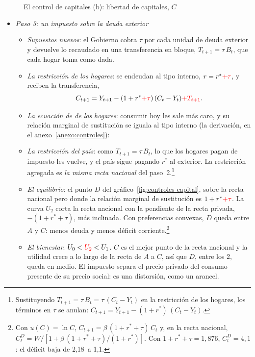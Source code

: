 \documentclass[11pt]{article}
\begin{document}
\begin{figure}[H]
\centering
\caption{El control de capitales (b): libertad de capitales, $C$}\label{fig:controles-paso2}
\end{figure}

\begin{itemize}
\item \emph{Paso 3: un impuesto sobre la deuda exterior}
  \begin{itemize}
  \item \emph{Supuestos nuevos}: el Gobierno cobra \textcolor{tceerojo}{$\tau$ por cada unidad de deuda exterior} y devuelve lo recaudado en \textcolor{tceerojo}{una transferencia en bloque, $T_{t+1}=\tau\,B_t$}, que cada hogar toma como dada.
  \item \emph{La restricción de los hogares}: se endeudan al tipo interno, $r=r^*{\color{red}+\tau}$, y reciben la transferencia,
    $$C_{t+1}=Y_{t+1}-(1+r^*{\color{red}+\tau})\,(C_t-Y_t){\color{red}+T_{t+1}}.$$
  \item \emph{La ecuación de  de los hogares}: consumir hoy les sale más caro, y su relación marginal de sustitución se iguala al tipo interno (la derivación, en el anexo~\ref{anexo:controles}):
  \item \emph{La restricción del país}: como \textcolor{tceerojo}{$T_{t+1}=\tau\,B_t$}, lo que los hogares pagan de impuesto les vuelve, y el país sigue pagando $r^*$ al exterior. La restricción agregada es \emph{la misma recta nacional} del paso~2.\footnote{Sustituyendo $T_{t+1}=\tau\,B_t=\tau\,(C_t-Y_t)$ en la restricción de los hogares, los términos en $\tau$ se anulan: $C_{t+1}=Y_{t+1}-(1+r^*)\,(C_t-Y_t)$.}
  \item \emph{El equilibrio}: el punto \textcolor{tceerojo}{$D$} del gráfico~\ref{fig:controles-capital}, sobre la recta nacional pero donde la relación marginal de sustitución es $1+r^*{\color{red}+\tau}$. La curva \textcolor{tceerojo}{$U_2$} corta la recta nacional con la pendiente de la \textcolor{tceerojo}{recta privada, $-(1+r^*+\tau)$}, más inclinada. Con preferencias convexas, $D$ queda entre $A$ y $C$: menos deuda y menos déficit corriente.\footnote{Con $u(C)=\ln C$, $C_{t+1}=\beta\,(1+r^*+\tau)\,C_t$ y, en la recta nacional, $C^D_t=W/[1+\beta\,(1+r^*+\tau)/(1+r^*)]$. Con $1+r^*+\tau=1{,}876$, $C^D_t=4{,}1$: el déficit baja de 2,18~a 1,1.}
  \item \emph{El bienestar}: $U_0<{\color{red}U_2}<U_1$. $C$ es el mejor punto de la recta nacional y la utilidad crece a lo largo de la recta de $A$ a $C$, así que $D$, entre los 2, queda en medio. El impuesto separa el precio privado del consumo presente de su precio social: es una distorsión, como un arancel.
  \end{itemize}
\end{itemize}
\end{document}
